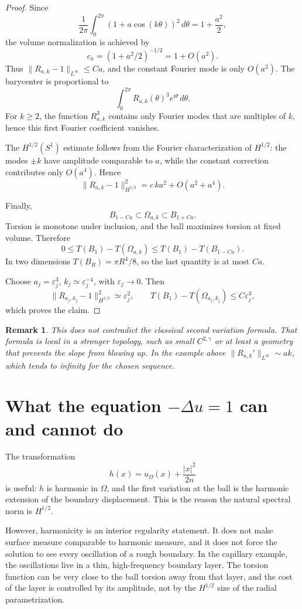 \documentclass[11pt]{article}
\newtheorem{remark}[theorem]{Remark}
\newcommand{\Om}{\Omega}
\newcommand{\eps}{\varepsilon}
\begin{document}
\begin{proof}
Since
\[
   \frac1{2\pi}\int_0^{2\pi}(1+a\cos(k\theta))^2\,d\theta
      =1+\frac{a^2}{2},
\]
the volume normalization is achieved by
\[
   c_a=(1+a^2/2)^{-1/2}=1+O(a^2).
\]
Thus \(\|R_{a,k}-1\|_{L^\infty}\le Ca\), and the constant Fourier mode is
only \(O(a^2)\).  The barycenter is proportional to
\[
   \int_0^{2\pi}R_{a,k}(\theta)^3 e^{i\theta}\,d\theta.
\]
For \(k\ge2\), the function \(R_{a,k}^3\) contains only Fourier modes that are
multiples of \(k\), hence this first Fourier coefficient vanishes.

The \(H^{1/2}(S^1)\) estimate follows from the Fourier characterization of
\(H^{1/2}\): the modes \(\pm k\) have amplitude comparable to \(a\), while
the constant correction contributes only \(O(a^4)\).  Hence
\[
   \|R_{a,k}-1\|_{H^{1/2}}^2=c\,k a^2+O(a^2+a^4).
\]

Finally,
\[
   B_{1-Ca}\subset \Om_{a,k}\subset B_{1+Ca}.
\]
Torsion is monotone under inclusion, and the ball maximizes torsion at fixed
volume.  Therefore
\[
   0\le T(B_1)-T(\Om_{a,k})
      \le T(B_1)-T(B_{1-Ca}).
\]
In two dimensions \(T(B_R)=\pi R^4/8\), so the last quantity is at most
\(Ca\).

Choose \(a_j=\eps_j^3\), \(k_j\simeq \eps_j^{-4}\), with \(\eps_j\to0\).
Then
\[
   \|R_{a_j,k_j}-1\|_{H^{1/2}}^2\simeq \eps_j^2,
   \qquad
   T(B_1)-T(\Om_{a_j,k_j})\le C\eps_j^3,
\]
which proves the claim.
\end{proof}

\begin{remark}
This does not contradict the classical second variation formula.  That formula
is local in a stronger topology, such as small \(C^{2,\gamma}\) or at least a
geometry that prevents the slope from blowing up.  In the example above
\(\|R_{a,k}'\|_{L^\infty}\sim ak\), which tends to infinity for the chosen
sequence.
\end{remark}

\section{What the equation \(-\Delta u=1\) can and cannot do}

The transformation
\[
   h(x)=u_\Om(x)+\frac{|x|^2}{2n}
\]
is useful: \(h\) is harmonic in \(\Om\), and the first variation at the ball is
the harmonic extension of the boundary displacement.  This is the reason the
natural spectral norm is \(H^{1/2}\).

However, harmonicity is an interior regularity statement.  It does not make
surface measure comparable to harmonic measure, and it does not force the
solution to see every oscillation of a rough boundary.  In the capillary
example, the oscillations live in a thin, high-frequency boundary layer.  The
torsion function can be very close to the ball torsion away from that layer,
and the cost of the layer is controlled by its amplitude, not by the
\(H^{1/2}\) size of the radial parametrization.
\end{document}
